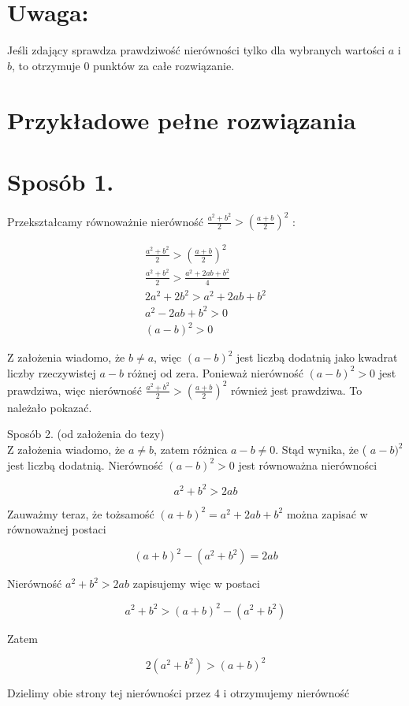 \documentclass[10pt]{article}
\begin{document}
\section*{Uwaga:}
Jeśli zdający sprawdza prawdziwość nierówności tylko dla wybranych wartości $a$ i $b$, to otrzymuje 0 punktów za całe rozwiązanie.

\section*{Przykładowe pełne rozwiązania}
\section*{Sposób 1.}
Przekształcamy równoważnie nierówność $\frac{a^{2}+b^{2}}{2}>\left(\frac{a+b}{2}\right)^{2}$ :

$$
\begin{gathered}
\frac{a^{2}+b^{2}}{2}>\left(\frac{a+b}{2}\right)^{2} \\
\frac{a^{2}+b^{2}}{2}>\frac{a^{2}+2 a b+b^{2}}{4} \\
2 a^{2}+2 b^{2}>a^{2}+2 a b+b^{2} \\
a^{2}-2 a b+b^{2}>0 \\
(a-b)^{2}>0
\end{gathered}
$$

Z założenia wiadomo, że $b \neq a$, więc $(a-b)^{2}$ jest liczbą dodatnią jako kwadrat liczby rzeczywistej $a-b$ różnej od zera. Ponieważ nierówność $(a-b)^{2}>0$ jest prawdziwa, więc nierówność $\frac{a^{2}+b^{2}}{2}>\left(\frac{a+b}{2}\right)^{2}$ również jest prawdziwa. To należało pokazać.

Sposób 2. (od założenia do tezy)\\
Z założenia wiadomo, że $a \neq b$, zatem różnica $a-b \neq 0$. Stąd wynika, że ( $a-b)^{2}$ jest liczbą dodatnią. Nierówność $(a-b)^{2}>0$ jest równoważna nierówności

$$
a^{2}+b^{2}>2 a b
$$

Zauważmy teraz, że tożsamość $(a+b)^{2}=a^{2}+2 a b+b^{2}$ można zapisać w równoważnej postaci

$$
(a+b)^{2}-\left(a^{2}+b^{2}\right)=2 a b
$$

Nierówność $a^{2}+b^{2}>2 a b$ zapisujemy więc w postaci

$$
a^{2}+b^{2}>(a+b)^{2}-\left(a^{2}+b^{2}\right)
$$

Zatem

$$
2\left(a^{2}+b^{2}\right)>(a+b)^{2}
$$

Dzielimy obie strony tej nierówności przez 4 i otrzymujemy nierówność
\end{document}
